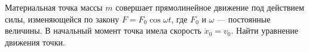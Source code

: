 Материальная точка массы $m$ совершает прямолинейное движение под
действием силы, изменяющейся по закону $F=F_0 \cos \omega t$, где $F_0$
и $\omega$ --- постоянные величины. В начальный момент точка имела
скорость $\dot x_0=v_0$. Найти уравнение движения точки. 
